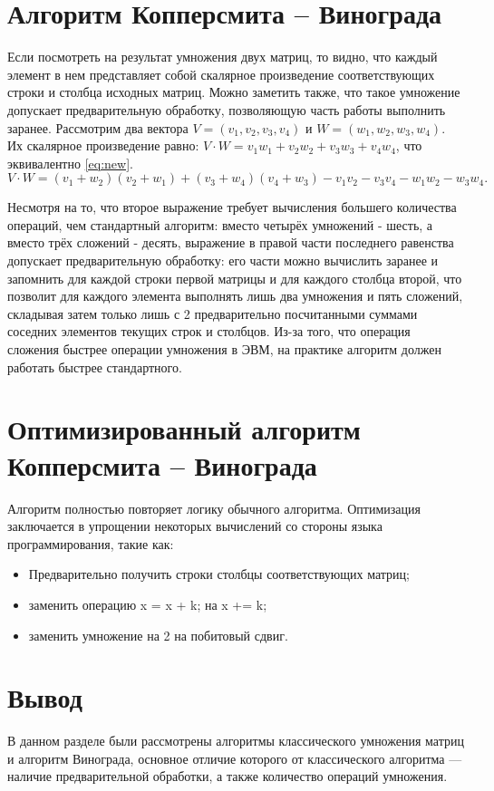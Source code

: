 \section{Алгоритм Копперсмита -- Винограда}

Если посмотреть на результат умножения двух матриц, то видно, что каждый элемент в нем представляет собой скалярное произведение соответствующих строки и столбца исходных матриц.
Можно заметить также, что такое умножение допускает предварительную обработку, позволяющую часть работы выполнить заранее.
\newpage
Рассмотрим два вектора $V = (v_1, v_2, v_3, v_4)$ и $W = (w_1, w_2, w_3, w_4)$.
Их скалярное произведение равно: $V \cdot W = v_1w_1 + v_2w_2 + v_3w_3 + v_4w_4$, что эквивалентно \eqref{eq:new}.
\begin{equation}
    \label{eq:new}
    V \cdot W = (v_1 + w_2)(v_2 + w_1) + (v_3 + w_4)(v_4 + w_3) - v_1v_2 - v_3v_4 - w_1w_2 - w_3w_4.
\end{equation}

Несмотря на то, что второе выражение требует вычисления большего количества операций, чем стандартный алгоритм: вместо четырёх умножений - шесть, а вместо трёх сложений - десять, выражение в правой части последнего равенства допускает предварительную обработку: его части можно вычислить заранее и запомнить для каждой строки первой матрицы и для каждого столбца второй, что позволит для каждого элемента выполнять лишь два умножения и пять сложений, складывая затем только лишь с 2 предварительно посчитанными суммами соседних элементов текущих строк и столбцов.
Из-за того, что операция сложения быстрее операции умножения в ЭВМ, на практике алгоритм должен работать быстрее стандартного.

\section{Оптимизированный алгоритм Копперсмита -- Винограда}

Алгоритм полностью повторяет логику обычного алгоритма.
Оптимизация заключается в упрощении некоторых вычислений со стороны языка программирования, такие как:

\begin{itemize}
    \item Предварительно получить строки столбцы соответствующих матриц;
    \item заменить операцию x = x + k; на x += k;
    \item заменить умножение на 2 на побитовый сдвиг.
\end{itemize}

\section*{Вывод}
В данном разделе были рассмотрены алгоритмы классического умножения матриц и алгоритм Винограда, основное отличие которого от классического алгоритма — наличие предварительной обработки, а также количество операций умножения.
\clearpage
